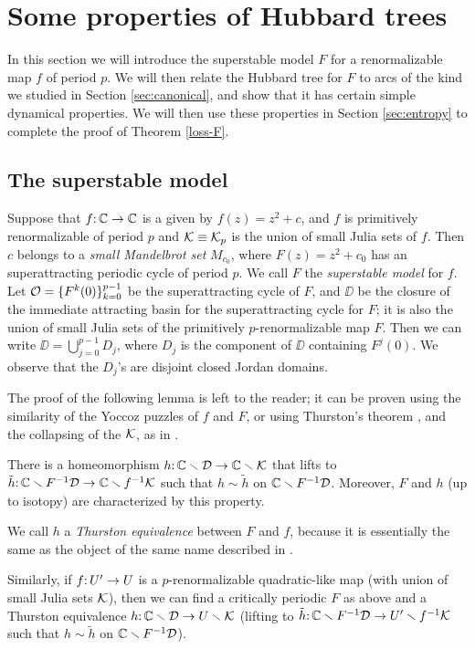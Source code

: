 \section{Some properties of Hubbard trees}\label{Hubbard trees}
In this section we will introduce the superstable model $F$ for a renormalizable map $f$ of period $p$.
We will then relate the Hubbard tree for $F$ to arcs of the kind we studied in Section \ref{sec:canonical},
and show that it has certain simple dynamical properties. We will then use these properties in Section \ref{sec:entropy} to complete the proof of Theorem \ref{loss-F}.

\subsection{The superstable model} \label{subsec:model}
\newcommand{\cdd}{{\DD}}

Suppose that $f\mathpunct: {\Bbb C}\to {\Bbb C}$ is a given by $f(z) = z^2 + c$,
and $f$ is primitively renormalizable of period $p$ and ${\mathcal K}\equiv {\mathcal K}_p$ is the union of small Julia sets of $f$.
Then $c$ belongs to a \emph{small Mandelbrot set} $M_{c_0}$,
where $F(z) = z^2 + c_0$ has an superattracting periodic cycle of period $p$.
We call $F$ the {\it superstable model}  for $f$.
Let ${\mathcal O}=\{F^k (0)\}_{k=0}^{p-1}$ be the superattracting cycle of $F$,
and $\DD$ be the closure of the immediate attracting basin for the superattracting cycle for $F$;
it is also the union of small Julia sets of the primitively $p$-renormalizable map $F$.
Then we can write $\DD = \bigcup_{j=0}^{p-1} D_j$,
where $D_j$ is the component of $\DD$ containing $F^j(0)$.
We observe that the $D_j$'s are disjoint closed Jordan domains.

The proof of the following lemma is left to the reader;
it can be proven using the similarity of the Yoccoz puzzles of $f$ and $F$,
or using Thurston's theorem \cite{DH-Thurston},
and the collapsing of the ${\mathcal K}$, as in \cite[Appendix B]{McM}.
\begin{lemma}
There is a homeomorphism $h\from \C\sm \cdd \to \C \sm \KK$ that  lifts to 
$\tilde h \from \C \sm F^{-1} \cdd \to \C \sm f^{-1} \KK$ such that
$h \sim \tilde h$ on $\C \sm F^{-1} \cdd$. 
Moreover, 
$F$ and $h$ (up to isotopy) are characterized by this property.
\end{lemma}
We call $h$ a \emph{Thurston equivalence} between $F$ and $f$, because it is essentially the same as the object of the same name described in \cite{DH-Thurston}.

Similarly,
if $f\mathpunct: U' \to U$ is a $p$-renormalizable quadratic-like map (with union of small Julia sets ${\mathcal K}$),
then we can find a critically periodic $F$ as above and a Thurston equivalence $h\mathpunct: {\Bbb C} \smallsetminus {{\mathcal D}} \to U \smallsetminus {\mathcal K}$
(lifting to $\tilde h \mathpunct: {\Bbb C} \smallsetminus F^{-1}  {\mathcal D} \to U' \smallsetminus f^{-1} {\mathcal K}$ such that
$h \sim \tilde h$ on $\C \sm F^{-1} \cdd$).

